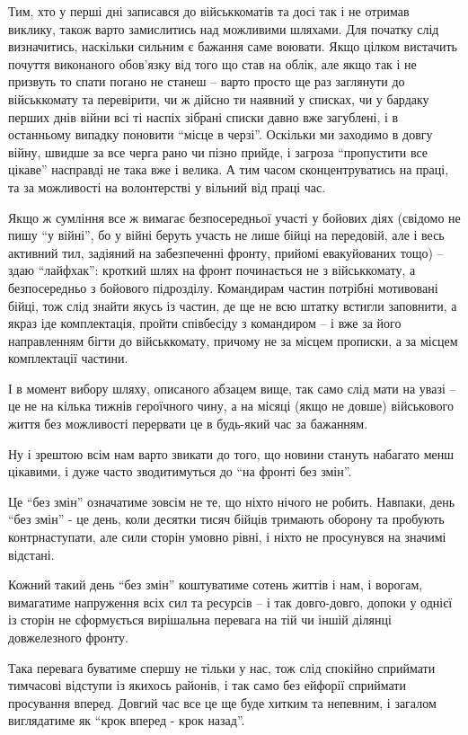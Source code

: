 Тим, хто у перші дні записався до військкоматів та досі так і не отримав
виклику, також варто замислитись над можливими шляхами. Для початку слід
визначитись, наскільки сильним є бажання саме воювати. Якщо цілком вистачить
почуття виконаного обов'язку від того що став на облік, але якщо так і не
призвуть то спати погано не станеш – варто просто ще раз заглянути до
військкомату та перевірити, чи ж дійсно ти наявний у списках, чи у бардаку
перших днів війни всі ті наспіх зібрані списки давно вже загублені, і в
останньому випадку поновити \enquote{місце в черзі}. Оскільки ми заходимо в довгу
війну, швидше за все черга рано чи пізно прийде, і загроза \enquote{пропустити все
цікаве} насправді не така вже і велика. А тим часом сконцентруватись на праці,
та за можливості на волонтерстві у вільний від праці час.

Якщо ж сумління все ж вимагає безпосередньої участі у бойових діях (свідомо не
пишу \enquote{у війні}, бо у війні беруть участь не лише бійці на передовій, але і весь
активний тил, задіяний на забезпеченні фронту, прийомі евакуйованих тощо) –
здаю \enquote{лайфхак}: кроткий шлях на фронт починається не з військкомату, а
безпосередньо з бойового підрозділу. Командирам частин потрібні мотивовані
бійці, тож слід знайти якусь із частин, де ще не всю штатку встигли заповнити,
а якраз іде комплектація, пройти співбесіду з командиром – і вже за його
направленням бігти до військкомату, причому не за місцем прописки, а за місцем
комплектації частини.

І в момент вибору шляху, описаного абзацем вище, так само слід мати на увазі –
це не на кілька тижнів героїчного чину, а на місяці (якщо не довше) військового
життя без можливості перервати це в будь-який час за бажанням.

Ну і зрештою всім нам варто звикати до того, що новини стануть набагато менш
цікавими, і дуже часто зводитимуться до \enquote{на фронті без змін}. 

Це \enquote{без змін} означатиме зовсім не те, що ніхто нічого не робить. Навпаки, день
\enquote{без змін} - це день, коли десятки тисяч бійців тримають оборону та пробують
контрнаступати, але сили сторін умовно рівні, і ніхто не просунувся на значимі
відстані.

Кожний такий день \enquote{без змін} коштуватиме сотень життів і нам, і ворогам,
вимагатиме напруження всіх сил та ресурсів – і так довго-довго, допоки у однієї
із сторін не сформується вирішальна перевага на тій чи іншій ділянці
довжелезного фронту. 

Така перевага буватиме спершу не тільки у нас, тож слід спокійно сприймати
тимчасові відступи із якихось районів, і так само без ейфорії сприймати
просування вперед. Довгий час все це ще буде хитким та непевним, і загалом
виглядатиме як \enquote{крок вперед  - крок назад}.

